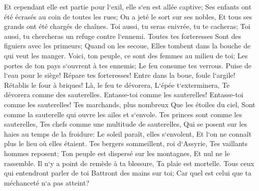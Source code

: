 \verse Et cependant elle est partie pour l`exil, elle s`en est allée captive; Ses enfants ont été écrasés au coin de toutes les rues; On a jeté le sort sur ses nobles, Et tous ses grands ont été chargés de chaînes. 
\verse Toi aussi, tu seras enivrée, tu te cacheras; Toi aussi, tu chercheras un refuge contre l`ennemi. 
\verse Toutes tes forteresses Sont des figuiers avec les primeurs; Quand on les secoue, Elles tombent dans la bouche de qui veut les manger. 
\verse Voici, ton peuple, ce sont des femmes au milieu de toi; Les portes de ton pays s`ouvrent à tes ennemis; Le feu consume tes verrous. 
\verse Puise de l`eau pour le siège! Répare tes forteresses! Entre dans la boue, foule l`argile! Rétablis le four à briques! 
\verse Là, le feu te dévorera, L`épée t`exterminera, Te dévorera comme des sauterelles. Entasse-toi comme les sauterelles! Entasse-toi comme les sauterelles! 
\verse Tes marchands, plus nombreux Que les étoiles du ciel, Sont comme la sauterelle qui ouvre les ailes et s`envole. 
\verse Tes princes sont comme les sauterelles, Tes chefs comme une multitude de sauterelles, Qui se posent sur les haies au temps de la froidure: Le soleil paraît, elles s`envolent, Et l`on ne connaît plus le lieu où elles étaient. 
\verse Tes bergers sommeillent, roi d`Assyrie, Tes vaillants hommes reposent; Ton peuple est dispersé sur les montagnes, Et nul ne le rassemble. 
\verse Il n`y a point de remède à ta blessure, Ta plaie est mortelle. Tous ceux qui entendront parler de toi Battront des mains sur toi; Car quel est celui que ta méchanceté n`a pas atteint? 
